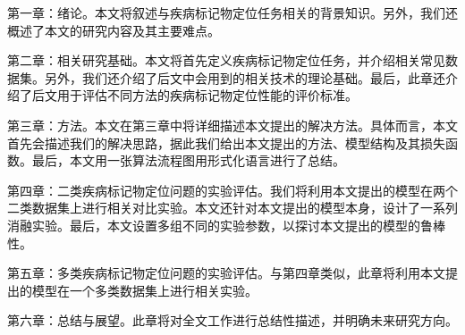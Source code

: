第一章：绪论。本文将叙述与疾病标记物定位任务相关的背景知识。另外，我们还概述了本文的研究内容及其主要难点。

第二章：相关研究基础。本文将首先定义疾病标记物定位任务，并介绍相关常见数据集。另外，我们还介绍了后文中会用到的相关技术的理论基础。最后，此章还介绍了后文用于评估不同方法的疾病标记物定位性能的评价标准。

第三章：方法。本文在第三章中将详细描述本文提出的解决方法。具体而言，本文首先会描述我们的解决思路，据此我们给出本文提出的方法、模型结构及其损失函数。最后，本文用一张算法流程图用形式化语言进行了总结。

第四章：二类疾病标记物定位问题的实验评估。我们将利用本文提出的模型在两个二类数据集上进行相关对比实验。本文还针对本文提出的模型本身，设计了一系列消融实验。最后，本文设置多组不同的实验参数，以探讨本文提出的模型的鲁棒性。

第五章：多类疾病标记物定位问题的实验评估。与第四章类似，此章将利用本文提出的模型在一个多类数据集上进行相关实验。

第六章：总结与展望。此章将对全文工作进行总结性描述，并明确未来研究方向。
